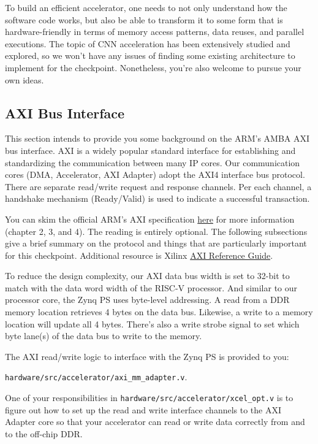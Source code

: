 \documentclass[11pt]{article}
\begin{document}
To build an efficient accelerator, one needs to not only understand how the software code works, but also be able to transform it to some form that is hardware-friendly in terms of memory access patterns, data reuses, and parallel executions. The topic of CNN acceleration has been extensively studied and explored, so we won't have any issues of finding some existing architecture to implement for the checkpoint. Nonetheless, you're also welcome to pursue your own ideas.

\subsection{AXI Bus Interface}

This section intends to provide you some background on the ARM's AMBA AXI bus interface.
AXI is a widely popular standard interface for establishing and standardizing the communication between many IP cores.
Our communication cores (DMA, Accelerator, AXI Adapter) adopt the AXI4 interface bus protocol.
There are separate read/write request and response channels.
Per each channel, a handshake mechanism (Ready/Valid) is used to indicate a successful transaction.

You can skim the official ARM's AXI specification \href{https://developer.arm.com/documentation/ihi0022/b}{here} for more information (chapter 2, 3, and 4).
The reading is entirely optional. The following subsections give a brief summary on the protocol and things that are particularly important for this checkpoint.
Additional resource is Xilinx \href{https://www.xilinx.com/support/documentation/ip\_documentation/ug761\_axi\_reference\_guide.pdf}{AXI Reference Guide}.

To reduce the design complexity, our AXI data bus width is set to 32-bit to match with the data word width of the RISC-V processor. And similar to our processor core, the Zynq PS uses byte-level addressing. A read from a DDR memory location retrieves 4 bytes on the data bus. Likewise, a write to a memory location will update all 4 bytes. There's also a write strobe signal to set which byte lane(s) of the data bus to write to the memory.

The AXI read/write logic to interface with the Zynq PS is provided to you:

\verb|hardware/src/accelerator/axi_mm_adapter.v|.

One of your responsibilities in \verb|hardware/src/accelerator/xcel_opt.v| is to figure out how to set up the read and write interface channels to the AXI Adapter core so that your accelerator can read or write data correctly from and to the off-chip DDR.
\end{document}
